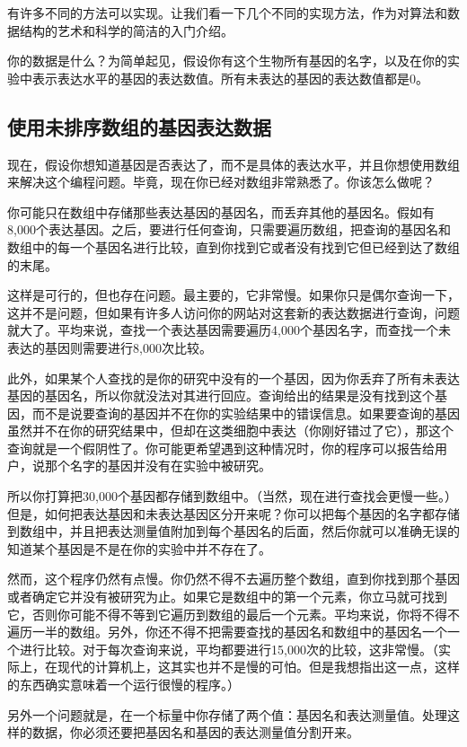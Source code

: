 有许多不同的方法可以实现。让我们看一下几个不同的实现方法，作为对算法和数据结构的艺术和科学的简洁的入门介绍。

你的数据是什么？为简单起见，假设你有这个生物所有基因的名字，以及在你的实验中表示表达水平的基因的表达数值。所有未表达的基因的表达数值都是0。

\subsection{使用未排序数组的基因表达数据}
现在，假设你想知道基因是否表达了，而不是具体的表达水平，并且你想使用数组来解决这个编程问题。毕竟，现在你已经对数组非常熟悉了。你该怎么做呢？

你可能只在数组中存储那些表达基因的基因名，而丢弃其他的基因名。假如有8,000个表达基因。之后，要进行任何查询，只需要遍历数组，把查询的基因名和数组中的每一个基因名进行比较，直到你找到它或者没有找到它但已经到达了数组的末尾。

这样是可行的，但也存在问题。最主要的，它非常慢。如果你只是偶尔查询一下，这并不是问题，但如果有许多人访问你的网站对这套新的表达数据进行查询，问题就大了。平均来说，查找一个表达基因需要遍历4,000个基因名字，而查找一个未表达的基因则需要进行8,000次比较。

此外，如果某个人查找的是你的研究中没有的一个基因，因为你丢弃了所有未表达基因的基因名，所以你就没法对其进行回应。查询给出的结果是没有找到这个基因，而不是说要查询的基因并不在你的实验结果中的错误信息。如果要查询的基因虽然并不在你的研究结果中，但却在这类细胞中表达（你刚好错过了它），那这个查询就是一个假阴性了。你可能更希望遇到这种情况时，你的程序可以报告给用户，说那个名字的基因并没有在实验中被研究。

所以你打算把30,000个基因都存储到数组中。（当然，现在进行查找会更慢一些。）但是，如何把表达基因和未表达基因区分开来呢？你可以把每个基因的名字都存储到数组中，并且把表达测量值附加到每个基因名的后面，然后你就可以准确无误的知道某个基因是不是在你的实验中并不存在了。

然而，这个程序仍然有点慢。你仍然不得不去遍历整个数组，直到你找到那个基因或者确定它并没有被研究为止。如果它是数组中的第一个元素，你立马就可找到它，否则你可能不得不等到它遍历到数组的最后一个元素。平均来说，你将不得不遍历一半的数组。另外，你还不得不把需要查找的基因名和数组中的基因名一个一个进行比较。对于每次查询来说，平均都要进行15,000次的比较，这非常慢。（实际上，在现代的计算机上，这其实也并不是慢的可怕。但是我想指出这一点，这样的东西确实意味着一个运行很慢的程序。）

另外一个问题就是，在一个标量中你存储了两个值：基因名和表达测量值。处理这样的数据，你必须还要把基因名和基因的表达测量值分割开来。

